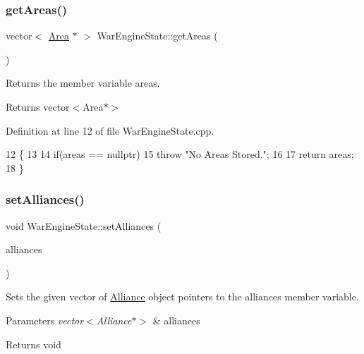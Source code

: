 \subsubsection{\texorpdfstring{get\+Areas()}{getAreas()}}
{\footnotesize\ttfamily vector$<$ \hyperlink{classArea}{Area} $\ast$ $>$ War\+Engine\+State\+::get\+Areas (\begin{DoxyParamCaption}{ }\end{DoxyParamCaption})}



Returns the member variable areas. 

\begin{DoxyReturn}{Returns}
vector$<$\+Area$\ast$$>$ 
\end{DoxyReturn}


Definition at line 12 of file War\+Engine\+State.\+cpp.


\begin{DoxyCode}
12                                        \{
13 
14     \textcolor{keywordflow}{if}(areas == \textcolor{keyword}{nullptr})
15     \textcolor{keywordflow}{throw} \textcolor{stringliteral}{"No Areas Stored."};
16 
17     \textcolor{keywordflow}{return} areas;
18 \}
\end{DoxyCode}
\mbox{\label{classWarEngineState_ad7ec9ef65bbbf550b6566a54b7938136}} 
\subsubsection{\texorpdfstring{set\+Alliances()}{setAlliances()}}
{\footnotesize\ttfamily void War\+Engine\+State\+::set\+Alliances (\begin{DoxyParamCaption}\item[{vector$<$ \hyperlink{classAlliance}{Alliance} $\ast$$>$}]{alliances }\end{DoxyParamCaption})}



Sets the given vector of \hyperlink{classAlliance}{Alliance} object pointers to the alliances member variable. 


\begin{DoxyParams}{Parameters}
{\em vector$<$\+Alliance$\ast$$>$} & alliances \\
\hline
\end{DoxyParams}
\begin{DoxyReturn}{Returns}
void 
\end{DoxyReturn}


